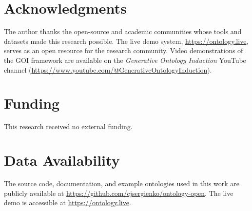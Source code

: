 \documentclass[runningheads,a4paper]{llncs}
\begin{document}
\section*{Acknowledgments}
The author thanks the open-source and academic communities whose tools
and datasets made this research possible. The live demo system,
\url{https://ontology.live}, serves as an open resource for the research
community. Video demonstrations of the GOI framework are available on
the \textit{Generative Ontology Induction} YouTube channel
(\url{https://www.youtube.com/@GenerativeOntologyInduction}).

\section*{Funding}
This research received no external funding.

\section*{Data Availability}
The source code, documentation, and example ontologies used in this work
are publicly available at
\url{https://github.com/cjsergienko/ontology-open}.
The live demo is accessible at \url{https://ontology.live}.
\end{document}
